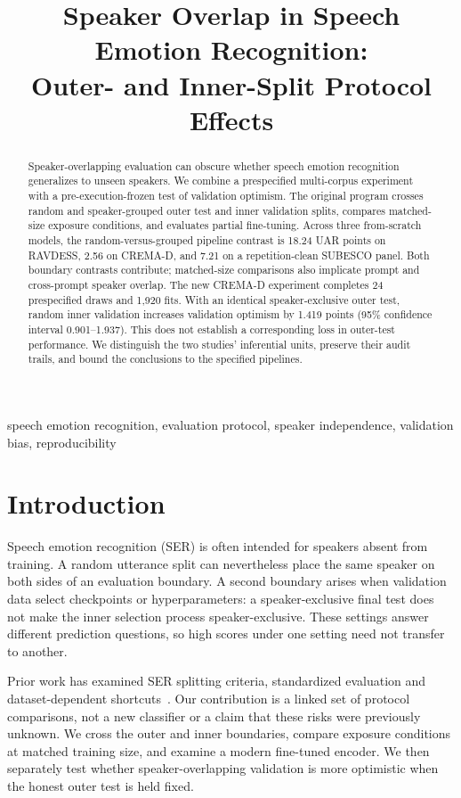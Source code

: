 \documentclass[letterpaper]{article}
\title{Speaker Overlap in Speech Emotion Recognition:\\Outer- and Inner-Split Protocol Effects}
\begin{document}
\maketitle

\begin{abstract}
Speaker-overlapping evaluation can obscure whether speech emotion recognition generalizes to unseen speakers. We combine a prespecified multi-corpus experiment with a pre-execution-frozen test of validation optimism. The original program crosses random and speaker-grouped outer test and inner validation splits, compares matched-size exposure conditions, and evaluates partial fine-tuning. Across three from-scratch models, the random-versus-grouped pipeline contrast is 18.24 UAR points on RAVDESS, 2.56 on CREMA-D, and 7.21 on a repetition-clean SUBESCO panel. Both boundary contrasts contribute; matched-size comparisons also implicate prompt and cross-prompt speaker overlap. The new CREMA-D experiment completes 24 prespecified draws and 1,920 fits. With an identical speaker-exclusive outer test, random inner validation increases validation optimism by 1.419 points (95\% confidence interval 0.901--1.937). This does not establish a corresponding loss in outer-test performance. We distinguish the two studies' inferential units, preserve their audit trails, and bound the conclusions to the specified pipelines.
\end{abstract}
\begin{keywords}
speech emotion recognition, evaluation protocol, speaker independence, validation bias, reproducibility
\end{keywords}

\section{Introduction}
Speech emotion recognition (SER) is often intended for speakers absent from training. A random utterance split can nevertheless place the same speaker on both sides of an evaluation boundary. A second boundary arises when validation data select checkpoints or hyperparameters: a speaker-exclusive final test does not make the inner selection process speaker-exclusive. These settings answer different prediction questions, so high scores under one setting need not transfer to another.

Prior work has examined SER splitting criteria, standardized evaluation and dataset-dependent shortcuts~\cite{atmaja,antoniou,serab,meyer}. Our contribution is a linked set of protocol comparisons, not a new classifier or a claim that these risks were previously unknown. We cross the outer and inner boundaries, compare exposure conditions at matched training size, and examine a modern fine-tuned encoder. We then separately test whether speaker-overlapping validation is more optimistic when the honest outer test is held fixed.
\end{document}
